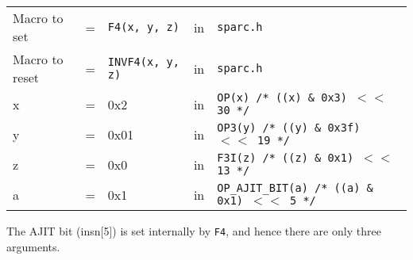 \begin{enumerate}
  \begin{tabular}[h]{lclcl}
    Macro to set  &=& \texttt{F4(x, y, z)} &in& \texttt{sparc.h}     \\
    Macro to reset  &=& \texttt{INVF4(x, y, z)} &in& \texttt{sparc.h}     \\
    x &=& 0x2      &in& \texttt{OP(x)  /* ((x) \& 0x3)  $<<$ 30 */} \\
    y &=& 0x01     &in& \texttt{OP3(y) /* ((y) \& 0x3f) $<<$ 19 */} \\
    z &=& 0x0      &in& \texttt{F3I(z) /* ((z) \& 0x1)  $<<$ 13 */} \\
    a &=& 0x1      &in& \texttt{OP\_AJIT\_BIT(a) /* ((a) \& 0x1)  $<<$ 5 */}
  \end{tabular}

  The AJIT bit  (insn[5]) is set internally by  \texttt{F4}, and hence
  there are only three arguments.


\end{enumerate}
